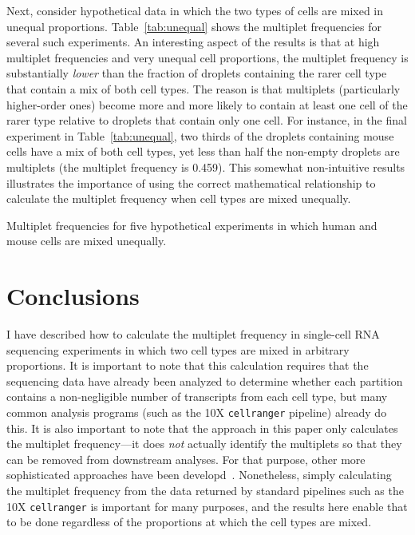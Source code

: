 \documentclass[fleqn,10pt]{wlpeerj} %
\begin{document}
Next, consider hypothetical data in which the two types of cells are mixed in unequal proportions.
Table~\ref{tab:unequal} shows the multiplet frequencies for several such experiments.
An interesting aspect of the results is that at high multiplet frequencies and very unequal cell proportions, the multiplet frequency is substantially \emph{lower} than the fraction of droplets containing the rarer cell type that contain a mix of both cell types.
The reason is that multiplets (particularly higher-order ones) become more and more likely to contain at least one cell of the rarer type relative to droplets that contain only one cell.
For instance, in the final experiment in Table~\ref{tab:unequal}, two thirds of the droplets containing mouse cells have a mix of both cell types, yet less than half the non-empty droplets are multiplets (the multiplet frequency is 0.459).
This somewhat non-intuitive results illustrates the importance of using the correct mathematical relationship to calculate the multiplet frequency when cell types are mixed unequally.

\begin{table}[t]
\centering

\caption{\label{tab:unequal}
Multiplet frequencies for five hypothetical experiments in which human and mouse cells are mixed unequally.}
\end{table}

\section*{Conclusions}
I have described how to calculate the multiplet frequency in single-cell RNA sequencing experiments in which two cell types are mixed in arbitrary proportions.
It is important to note that this calculation requires that the sequencing data have already been analyzed to determine whether each partition contains a non-negligible number of transcripts from each cell type, but many common analysis programs (such as the 10X \texttt{cellranger} pipeline) already do this.
It is also important to note that the approach in this paper only calculates the multiplet frequency---it does \emph{not} actually identify the multiplets so that they can be removed from downstream analyses.
For that purpose, other more sophisticated approaches have been developd~\citep{ilicic2016classification,stoeckius2017cell,kang2018multiplexed}.
Nonetheless, simply calculating the multiplet frequency from the data returned by standard pipelines such as the 10X \texttt{cellranger} is important for many purposes, and the results here enable that to be done regardless of the proportions at which the cell types are mixed.
\end{document}

